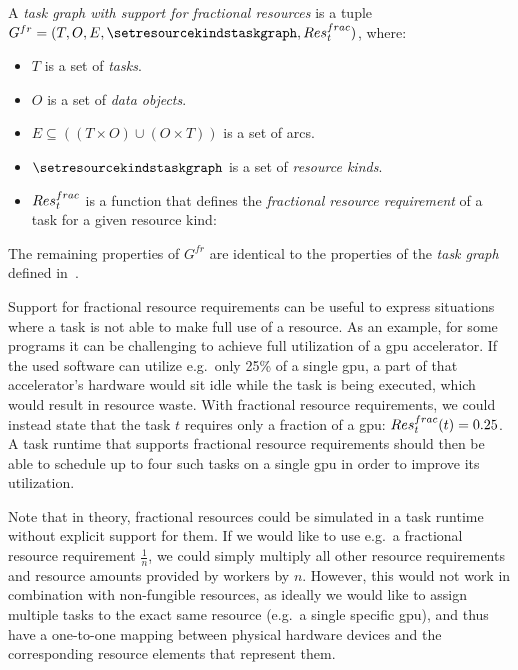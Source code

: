 \vspace{2mm} A
\emph{task graph with support for fractional resources} is a tuple \\
$G^{fr} = (T, O, E, \setresourcekindstaskgraph, \fntaskresfrac)$, where:
\begin{itemize}[itemsep=0pt]
	\item $T$ is a set of \emph{tasks}.
	\item $O$ is a set of \emph{data objects}.
	\item $E \subseteq ((T\times{}O) \cup (O\times{}T))$ is a set of arcs.
	\item $\setresourcekindstaskgraph$ is a set of \emph{resource kinds}.
	\item $Res_t^{frac}$ is a function that defines the
	\emph{fractional resource requirement} of a task for a given resource kind: \\
\end{itemize}

The remaining properties of $G^{fr}$ are identical to the properties of the \emph{task graph}
defined in~.

Support for fractional resource requirements can be useful to express situations where a task is
not able to make full use of a resource. As an example, for some programs it can be challenging to
achieve full utilization of a \gls{gpu} accelerator. If the used software can utilize
e.g.\ only 25\% of a single \gls{gpu}, a part of that accelerator's hardware would
sit idle while the task is being executed, which would result in resource waste. With fractional
resource requirements, we could instead state that the task $t$ requires only a
fraction of a \gls{gpu}: $Res_t^{frac}(t) = 0.25$. A task runtime that supports
fractional resource requirements should then be able to schedule up to four such tasks on a single
\gls{gpu} in order to improve its utilization.

Note that in theory, fractional resources could be simulated in a task runtime without explicit
support for them. If we would like to use e.g.\ a fractional resource requirement
$\frac{1}{n}$, we could simply multiply all other resource requirements and resource
amounts provided by workers by $n$. However, this would not work in combination
with non-fungible resources, as ideally we would like to assign multiple tasks to the exact same
resource (e.g.\ a single specific \gls{gpu}), and thus have a one-to-one mapping
between physical hardware devices and the corresponding resource elements that represent them.

